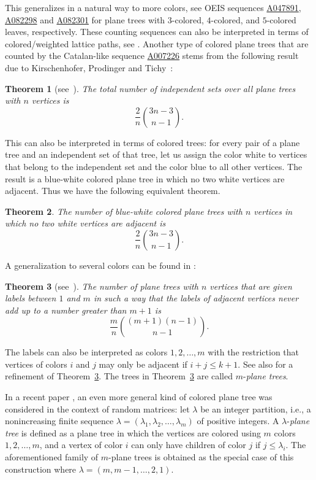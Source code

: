 \documentclass[12pt]{amsart}
\newtheorem{theorem}{Theorem}
\newcommand{\seqnum}[1]{\href{https://oeis.org/#1}{#1}}
\begin{document}
This generalizes in a natural way to more colors, see OEIS sequences \seqnum{A047891}, \seqnum{A082298} and \seqnum{A082301} for plane trees with $3$-colored, $4$-colored, and $5$-colored leaves, respectively. 
These counting sequences can also be interpreted in terms of colored/weighted lattice paths, see \cite{Barry2019Generalized,CP2017Identities}.
Another type of colored plane trees that are counted by the Catalan-like sequence \seqnum{A007226} stems from the following result due to Kirschenhofer, Prodinger and Tichy~\cite{KPT1986Fibonacci}:

\begin{theorem}[{see~\cite{KPT1986Fibonacci}}]\label{thm:indsets}
The total number of independent sets over all plane trees with $n$ vertices is
$$\frac{2}{n} \binom{3n-3}{n-1}.$$
\end{theorem}

This can also be interpreted in terms of colored trees: for every pair of a plane tree and an independent set of that tree, let us assign the color white to vertices that belong to the independent set and the color blue to all other vertices. The result is a blue-white colored plane tree in which no two white vertices are adjacent. Thus we have the following equivalent theorem.

\begin{theorem}\label{thm:red-blue}
The number of blue-white colored plane trees with $n$ vertices in which no two white vertices are adjacent is
$$\frac{2}{n} \binom{3n-3}{n-1}.$$
\end{theorem}

A generalization to several colors can be found in \cite{GPW2010Bijections}:

\begin{theorem}[{see~\cite{GPW2010Bijections}}]\label{thm:k-plane}
The number of plane trees with $n$ vertices that are given labels between $1$ and $m$ in such a way that the labels of adjacent vertices never add up to a number greater than $m+1$ is
$$\frac{m}{n} \binom{(m+1)(n-1)}{n-1}.$$
\end{theorem}

The labels can also be interpreted as colors 
$1,2,\ldots,m$ with the restriction that vertices of colors $i$ and $j$ may only be adjacent if $i+j \leq k+1$. See also \cite{OW2024Refined} for a refinement of Theorem~\ref{thm:k-plane}. The trees in Theorem~\ref{thm:k-plane} are called $m$-\emph{plane trees}.

In a recent paper \cite{BC2024Lambda}, an even more general kind of colored plane tree was considered in the context of random matrices: let $\lambda$ be an integer partition, i.e., a nonincreasing finite sequence $\lambda = (\lambda_1,\lambda_2,\ldots,\lambda_m)$ of positive integers. A $\lambda$-\emph{plane tree} is defined as a plane tree in which the vertices are colored using $m$ colors 
$1,2,\ldots,m$,
and a vertex of color $i$ can only have children of color $j$ if $j \leq \lambda_i$. The aforementioned family of $m$-plane trees is obtained as the special case of this construction where $\lambda = (m,m-1,\ldots,2,1)$.
\end{document}
